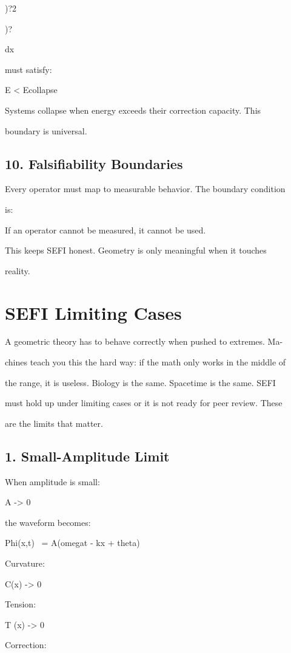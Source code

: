 \documentclass[10pt]{article}
\begin{document}
)?2

)?

dx


must satisfy:

E < Ecollapse

Systems collapse when energy exceeds their correction capacity. This

boundary is universal.

\subsection*{10. Falsifiability Boundaries}
Every operator must map to measurable behavior. The boundary condition

is:

If an operator cannot be measured, it cannot be used.

This keeps SEFI honest. Geometry is only meaningful when it touches

reality.

\section*{SEFI Limiting Cases}
A geometric theory has to behave correctly when pushed to extremes. Ma-

chines teach you this the hard way: if the math only works in the middle of

the range, it is useless. Biology is the same. Spacetime is the same. SEFI

must hold up under limiting cases or it is not ready for peer review. These

are the limits that matter.

\subsection*{1. Small-Amplitude Limit}
When amplitude is small:

A -> 0

the waveform becomes:

Phi(x,t) ~= A(omegat - kx + theta)

Curvature:

C(x) -> 0

Tension:


T (x) -> 0

Correction:
\end{document}
